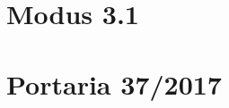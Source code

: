 
\begin{anexosenv}
\partanexos

\chapter{Modus 3.1}     %
\label{chap:anexoA}



\chapter{Portaria 37/2017}
\label{chap:anexoB}


\end{anexosenv}
